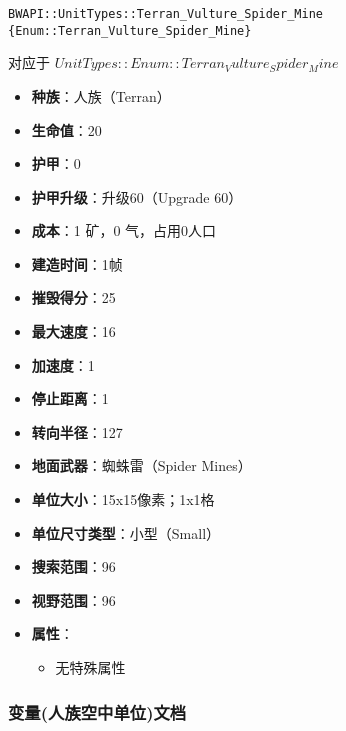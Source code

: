 \begin{tcolorbox}[colback=white, colframe=black!60!white, title=Terran\_Vulture\_Spider\_Mine(), arc=0mm]
    \begin{verbatim}
BWAPI::UnitTypes::Terran_Vulture_Spider_Mine {Enum::Terran_Vulture_Spider_Mine}
    \end{verbatim}
    对应于  $ UnitTypes::Enum::Terran_Vulture_Spider_Mine $ 
    
    \begin{itemize}
        \item \textbf{种族}：人族（Terran）
        \item \textbf{生命值}：20
        \item \textbf{护甲}：0
        \item \textbf{护甲升级}：升级60（Upgrade 60）
        \item \textbf{成本}：1 矿，0 气，占用0人口
        \item \textbf{建造时间}：1帧
        \item \textbf{摧毁得分}：25
        \item \textbf{最大速度}：16
        \item \textbf{加速度}：1
        \item \textbf{停止距离}：1
        \item \textbf{转向半径}：127
        \item \textbf{地面武器}：蜘蛛雷（Spider Mines）
        \item \textbf{单位大小}：15x15像素；1x1格
        \item \textbf{单位尺寸类型}：小型（Small）
        \item \textbf{搜索范围}：96
        \item \textbf{视野范围}：96
        \item \textbf{属性}：
            \begin{itemize}
                \item 无特殊属性
            \end{itemize}
    \end{itemize}
\end{tcolorbox}

\subsubsection{变量(人族空中单位)文档}

